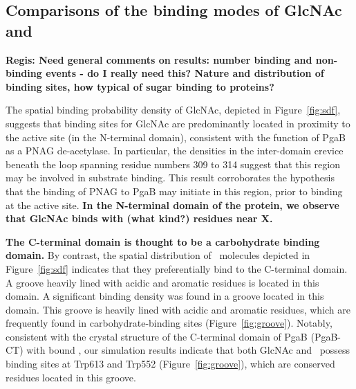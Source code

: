 \subsection{Comparisons of the binding modes of GlcNAc and \glucosamine}
\textbf{Regis: Need general comments on results: number binding and non-binding events - do I really need this? Nature and distribution of binding sites, how typical of sugar binding to proteins?}

The spatial binding probability density of GlcNAc, depicted in Figure~\ref{fig:sdf}, suggests that binding sites for GlcNAc are predominantly located in proximity to the active site (in the N-terminal domain), consistent with the function of PgaB as a PNAG de-acetylase. In particular, the densities in the inter-domain crevice beneath the loop spanning residue numbers 309 to 314 suggest that this region may be involved in substrate binding. This result corroborates the hypothesis that the binding of PNAG to PgaB may initiate in this region, prior to binding at the active site.\cite{Little:2012dp}  \textbf{In the N-terminal domain of the protein, we observe that GlcNAc binds with (what kind?) residues near X.}




\textbf{The C-terminal domain is thought to be a carbohydrate binding domain.} By contrast, the spatial distribution of \glucosamine\ molecules depicted in Figure~\ref{fig:sdf} indicates that they preferentially bind to the C-terminal domain. A groove heavily lined with acidic and aromatic residues is located in this domain.  A significant binding density was found in a groove located in this domain.  This groove is heavily lined with acidic and aromatic residues, which are frequently found in carbohydrate-binding sites (Figure~\ref{fig:groove}). Notably, consistent with the crystal structure of the C-terminal domain of PgaB (PgaB-CT) with bound \glucosamine, our simulation results indicate that both GlcNAc and \glucosamine\ possess binding sites at Trp613 and Trp552 (Figure~\ref{fig:groove}), which are conserved residues located in this groove.\cite{Little:2012dp}

